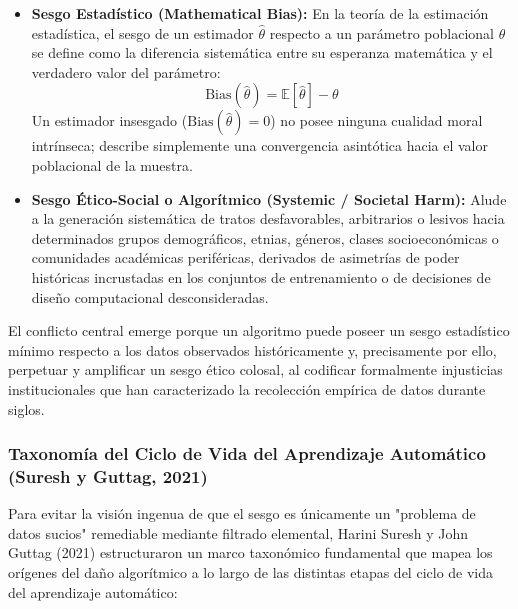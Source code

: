 \begin{itemize}
    \item \textbf{Sesgo Estadístico (Mathematical Bias):} En la teoría de la estimación estadística, el sesgo de un estimador $\hat{\theta}$ respecto a un parámetro poblacional $\theta$ se define como la diferencia sistemática entre su esperanza matemática y el verdadero valor del parámetro:
    \begin{equation}
    \text{Bias}(\hat{\theta}) = \mathbb{E}[\hat{\theta}] - \theta
    \end{equation}
    Un estimador insesgado ($\text{Bias}(\hat{\theta}) = 0$) no posee ninguna cualidad moral intrínseca; describe simplemente una convergencia asintótica hacia el valor poblacional de la muestra.
    \item \textbf{Sesgo Ético-Social o Algorítmico (Systemic / Societal Harm):} Alude a la generación sistemática de tratos desfavorables, arbitrarios o lesivos hacia determinados grupos demográficos, etnias, géneros, clases socioeconómicas o comunidades académicas periféricas, derivados de asimetrías de poder históricas incrustadas en los conjuntos de entrenamiento o de decisiones de diseño computacional desconsideradas.
\end{itemize}

El conflicto central emerge porque un algoritmo puede poseer un sesgo estadístico mínimo respecto a los datos observados históricamente y, precisamente por ello, perpetuar y amplificar un sesgo ético colosal, al codificar formalmente injusticias institucionales que han caracterizado la recolección empírica de datos durante siglos.

\subsubsection{Taxonomía del Ciclo de Vida del Aprendizaje Automático (Suresh y Guttag, 2021)}

Para evitar la visión ingenua de que el sesgo es únicamente un "problema de datos sucios" remediable mediante filtrado elemental, Harini Suresh y John Guttag (2021) estructuraron un marco taxonómico fundamental que mapea los orígenes del daño algorítmico a lo largo de las distintas etapas del ciclo de vida del aprendizaje automático:

